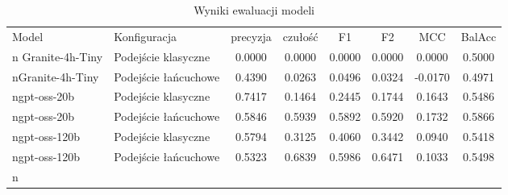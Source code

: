 \begin{table}[htbp]
\centering
\caption{Wyniki ewaluacji modeli}
\label{tab:wyniki}
\begin{tabular}{llcccccc}
\toprule
Model & Konfiguracja & precyzja & czułość & F1 & F2 & MCC & BalAcc \\n\midrule
Granite-4h-Tiny & Podejście klasyczne & 0.0000 & 0.0000 & 0.0000 & 0.0000 & 0.0000 & 0.5000 \\nGranite-4h-Tiny & Podejście łańcuchowe & 0.4390 & 0.0263 & 0.0496 & 0.0324 & -0.0170 & 0.4971 \\ngpt-oss-20b & Podejście klasyczne & 0.7417 & 0.1464 & 0.2445 & 0.1744 & 0.1643 & 0.5486 \\ngpt-oss-20b & Podejście łańcuchowe & 0.5846 & 0.5939 & 0.5892 & 0.5920 & 0.1732 & 0.5866 \\ngpt-oss-120b & Podejście klasyczne & 0.5794 & 0.3125 & 0.4060 & 0.3442 & 0.0940 & 0.5418 \\ngpt-oss-120b & Podejście łańcuchowe & 0.5323 & 0.6839 & 0.5986 & 0.6471 & 0.1033 & 0.5498 \\n\bottomrule
\end{tabular}
\end{table}
